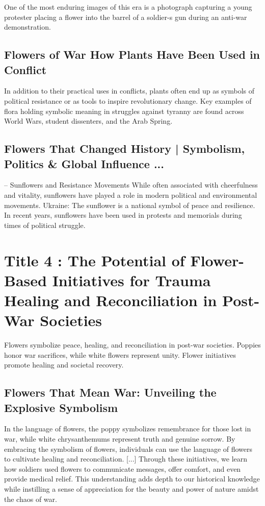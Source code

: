 \documentclass[12pt]{article}
\begin{document}
One of the most enduring images of this era is a photograph capturing a young protester placing a flower into the barrel of a soldier-s gun during an anti-war demonstration.\subsection{Flowers of War How Plants Have Been Used in Conflict}
In addition to their practical uses in conflicts, plants often end up as symbols of political resistance or as tools to inspire revolutionary change. Key examples of flora holding symbolic meaning in struggles against tyranny are found across World Wars, student dissenters, and the Arab Spring.\subsection{Flowers That Changed History | Symbolism, Politics \& Global Influence ...}
-- Sunflowers and Resistance Movements While often associated with cheerfulness and vitality, sunflowers have played a role in modern political and environmental movements. Ukraine: The sunflower is a national symbol of peace and resilience. In recent years, sunflowers have been used in protests and memorials during times of political struggle.
\section{Title 4 : The Potential of Flower-Based Initiatives for Trauma Healing and Reconciliation in Post-War Societies}
Flowers symbolize peace, healing, and reconciliation in post-war societies. Poppies honor war sacrifices, while white flowers represent unity. Flower initiatives promote healing and societal recovery.\subsection{Flowers That Mean War: Unveiling the Explosive Symbolism}
In the language of flowers, the poppy symbolizes remembrance for those lost in war, while white chrysanthemums represent truth and genuine sorrow. By embracing the symbolism of flowers, individuals can use the language of flowers to cultivate healing and reconciliation. [...] Through these initiatives, we learn how soldiers used flowers to communicate messages, offer comfort, and even provide medical relief. This understanding adds depth to our historical knowledge while instilling a sense of appreciation for the beauty and power of nature amidst the chaos of war.
\end{document}
